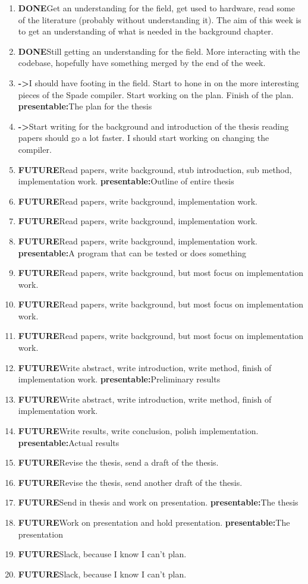 \documentclass[msc,lith,english]{liuthesis}
\begin{document}
\newcommand{\done}[0]{\textbf{DONE}}
\newcommand{\curr}[0]{\textbf{->}} %
\newcommand{\futr}[0]{\textbf{FUTURE}}
\newcommand{\presentable}[1]{\newline{}\textbf{presentable:}#1}

\begin{enumerate}
  \item \done Get an understanding for the field, get used to hardware, read some of the literature (probably without understanding it). The aim of this week is to get an understanding of what is needed in the background chapter.
  \item \done Still getting an understanding for the field. More interacting with the codebase, hopefully have something merged by the end of the week. 
  \item \curr I should have footing in the field. Start to hone in on the more interesting pieces of the Spade compiler. Start working on the plan. Finish of the plan. \presentable{The plan for the thesis}
  \item \curr Start writing for the background and introduction of the thesis reading papers should go a lot faster. I should start working on changing the compiler. 
  \item \futr Read papers, write background, stub introduction, sub method, implementation work. \presentable{Outline of entire thesis} 
  \item \futr Read papers, write background, implementation work. 
  \item \futr Read papers, write background, implementation work. 
  \item \futr Read papers, write background, implementation work. \presentable{A program that can be tested or does something} 
  \item \futr Read papers, write background, but most focus on implementation work.
  \item \futr Read papers, write background, but most focus on implementation work.
  \item \futr Read papers, write background, but most focus on implementation work.
  \item \futr Write abstract, write introduction, write method, finish of implementation work. \presentable{Preliminary results} 
  \item \futr Write abstract, write introduction, write method, finish of implementation work. 
  \item \futr Write results, write conclusion, polish implementation. \presentable{Actual results} 
  \item \futr Revise the thesis, send a draft of the thesis.
  \item \futr Revise the thesis, send another draft of the thesis.
  \item \futr Send in thesis and work on presentation. \presentable{The thesis} 
  \item \futr Work on presentation and hold presentation. \presentable{The presentation} 
  \item \futr Slack, because I know I can't plan.
  \item \futr Slack, because I know I can't plan.
\end{enumerate}
\end{document}
